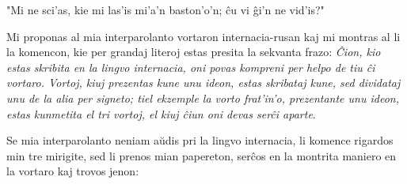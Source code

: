    "Mi ne sci'as, kie mi las'is mi'a'n baston'o'n; \^cu vi \^gi'n ne
vid'is?"

   Mi proponas al mia interparolanto vortaron internacia-rusan kaj mi
montras al li la komencon, kie per grandaj literoj estas presita la
sekvanta frazo: {\sl \^Cion, kio estas skribita en la lingvo
internacia, oni povas kompreni per helpo de tiu \^ci vortaro.
Vortoj, kiuj prezentas kune unu ideon, estas skribataj kune, sed
dividataj unu de la alia per signeto; tiel ekzemple la vorto
frat'in'o, prezentante unu ideon, estas kunmetita el tri vortoj, el
kiuj \^ciun oni devas ser\^ci aparte}.

   Se mia interparolanto neniam a\u udis pri la lingvo internacia, li
komence rigardos min tre mirigite, sed li prenos mian papereton,
ser\^cos en la montrita maniero en la vortaro kaj trovos jenon:

